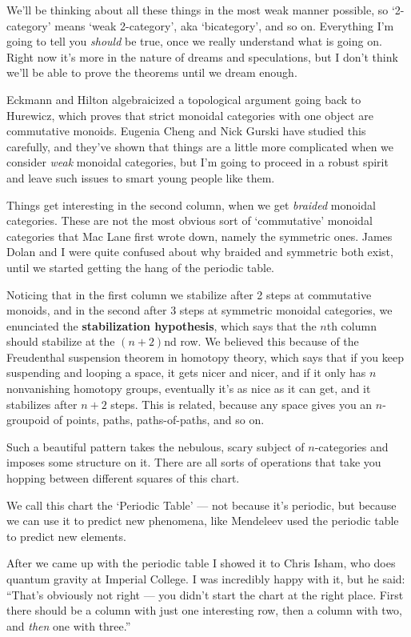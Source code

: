 \documentclass[12pt]{amsart}
\begin{document}
We'll be thinking about all these things in the most weak manner
possible, so `2-category' means `weak 2-category', aka
`bicategory', and so on.  Everything I'm going to tell you
\emph{should} be true, once we really understand what is going on.
Right now it's more in the nature of dreams and speculations, but I
don't think we'll be able to prove the theorems until we dream enough.

Eckmann and Hilton algebraicized a topological argument going back
to Hurewicz, which proves that strict monoidal categories with one object are
commutative monoids.  Eugenia Cheng and Nick Gurski have studied
this carefully, and they've shown that things are a little more
complicated when we consider \emph{weak} monoidal categories, 
but I'm going to proceed in a robust spirit and leave such issues
to smart young people like them.

Things get interesting in the second column, when we get \emph{braided}
monoidal categories.  These are not the most obvious sort of
`commutative' monoidal categories that Mac Lane first wrote down,
namely the symmetric ones.  James Dolan and I were quite
confused about why braided and symmetric both exist, until we started
getting the hang of the periodic table.  

Noticing that in the first column we stabilize after 2 steps at
commutative monoids, and in the second after 3 steps at symmetric
monoidal categories, we enunciated the {\bf stabilization hypothesis},
which says that the $n$th column should stabilize at the $(n+2)$nd
row.  We believed this because of the Freudenthal suspension theorem
in homotopy theory, which says that if you keep suspending and looping
a space, it gets nicer and nicer, and if it only has $n$ nonvanishing
homotopy groups, eventually it's as nice as it can get, and it
stabilizes after $n+2$ steps.  This is related, because any space
gives you an $n$-groupoid of points, paths, paths-of-paths, and so on.

Such a beautiful pattern takes the nebulous, scary subject of
$n$-categories and imposes some structure on it.  There are all sorts
of operations that take you hopping between different squares of this
chart.

We call this chart the `Periodic Table' --- not because it's periodic, 
but because we can use it to predict new phenomena, like Mendeleev used
the periodic table to predict new elements.

After we came up with the periodic table
I showed it to Chris Isham, who does quantum gravity at Imperial College.
I was incredibly happy with it, but he said: ``That's 
obviously not right --- you didn't start the chart at the right place.
First there should be a column with just one interesting row,
then a column with two, and {\it then} one with three.''  
\end{document}
